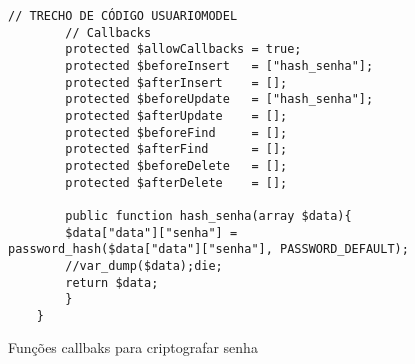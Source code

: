 \begin{figure}
    \centering
    \begin{lstlisting}[style=phplisting]
        // TRECHO DE CÓDIGO USUARIOMODEL
        // Callbacks
        protected $allowCallbacks = true;
        protected $beforeInsert   = ["hash_senha"];
        protected $afterInsert    = [];
        protected $beforeUpdate   = ["hash_senha"];
        protected $afterUpdate    = [];
        protected $beforeFind     = [];
        protected $afterFind      = [];
        protected $beforeDelete   = [];
        protected $afterDelete    = [];

        public function hash_senha(array $data){
        $data["data"]["senha"] = password_hash($data["data"]["senha"], PASSWORD_DEFAULT);
        //var_dump($data);die;
        return $data;
        }
    }
\end{lstlisting}
\caption{Funções callbaks para criptografar senha}
\label{fig:UsuarioModel_callbaks}
\end{figure}
